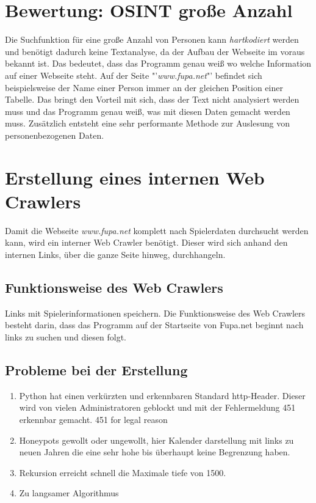 \section{Bewertung: OSINT große Anzahl}
Die Suchfunktion für eine große Anzahl von Personen kann \textit{hartkodiert} werden und benötigt dadurch keine Textanalyse, da der Aufbau der Webseite im voraus bekannt ist. Das bedeutet, dass das Programm genau weiß wo welche Information auf einer Webseite steht. Auf der Seite "'\textit{www.fupa.net}"' befindet sich beispielsweise der Name einer Person immer an der gleichen Position einer Tabelle. Das bringt den Vorteil mit sich, dass der Text nicht analysiert werden muss und das Programm genau weiß, was mit diesen Daten gemacht werden muss. Zusätzlich entsteht eine sehr performante Methode zur Auslesung von personenbezogenen Daten.


\section{Erstellung eines internen Web Crawlers} %
	\label{sse:}
	Damit die Webseite \textit{www.fupa.net} komplett nach Spielerdaten durchsucht werden kann, wird ein interner Web Crawler benötigt. Dieser wird sich anhand den internen Links, über die ganze Seite hinweg, durchhangeln.\\
	
	\subsection{Funktionsweise des Web Crawlers}
	Links mit Spielerinformationen speichern.
	Die Funktionsweise des Web Crawlers besteht darin, dass das Programm auf der Startseite von Fupa.net beginnt nach links zu suchen und diesen folgt.
	\subsection{Probleme bei der Erstellung} %
	\begin{enumerate}
		\item Python hat einen verkürzten und erkennbaren Standard http-Header. Dieser wird von vielen Administratoren geblockt und mit der Fehlermeldung 451 erkennbar gemacht. 451 for legal reason
		\item Honeypots gewollt oder ungewollt, hier Kalender darstellung mit links zu neuen Jahren die eine sehr hohe bis überhaupt keine Begrenzung haben.
		\item Rekursion erreicht schnell die Maximale tiefe von 1500.
		\item Zu langsamer Algorithmus
	\end{enumerate}
	
